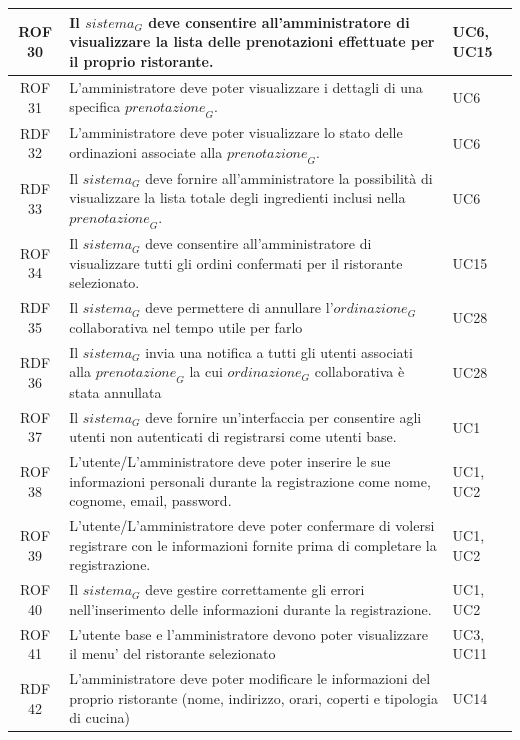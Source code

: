 \documentclass[12pt, oneside]{article}
\begin{document}
\begin{longtable}{|c|p{14cm}|p{2cm}|}
    ROF 30& Il $\textit{sistema}_G$ deve consentire all'amministratore di visualizzare la lista delle prenotazioni effettuate per il proprio ristorante. & UC6, UC15 \\
    \hline
    ROF 31& L'amministratore deve poter visualizzare i dettagli di una specifica $\textit{prenotazione}_G$. & UC6 \\
    \hline
    RDF 32& L'amministratore deve poter visualizzare lo stato delle ordinazioni associate alla $\textit{prenotazione}_G$. & UC6 \\
    \hline
    RDF 33& Il $\textit{sistema}_G$ deve fornire all'amministratore la possibilità di visualizzare la lista totale degli ingredienti inclusi nella $\textit{prenotazione}_G$. & UC6 \\
    \hline
    ROF 34& Il $\textit{sistema}_G$ deve consentire all'amministratore di visualizzare tutti gli ordini confermati per il ristorante selezionato. & UC15 \\
    \hline
    RDF 35& Il $\textit{sistema}_G$ deve permettere di annullare l'$\textit{ordinazione}_G$ collaborativa nel tempo utile per farlo & UC28 \\
    \hline
    RDF 36& Il $\textit{sistema}_G$ invia una notifica a tutti gli utenti associati alla $\textit{prenotazione}_G$ la cui $\textit{ordinazione}_G$ collaborativa è stata annullata & UC28 \\
    \hline
    ROF 37& Il $\textit{sistema}_G$ deve fornire un'interfaccia per consentire agli utenti non autenticati di registrarsi come utenti base. & UC1 \\
    \hline
    ROF 38& L'utente/L'amministratore deve poter inserire le sue informazioni personali durante la registrazione come nome, cognome, email, password. & UC1, UC2 \\
    \hline
    ROF 39& L'utente/L'amministratore deve poter confermare di volersi registrare con le informazioni fornite prima di completare la registrazione. & UC1, UC2 \\
    \hline
    ROF 40& Il $\textit{sistema}_G$ deve gestire correttamente gli errori nell'inserimento delle informazioni durante la registrazione. & UC1, UC2 \\
    \hline 
    ROF 41& L'utente base e l'amministratore devono poter visualizzare il menu' del ristorante selezionato & UC3, UC11\\
    \hline
    RDF 42& L'amministratore deve poter modificare le informazioni del proprio ristorante (nome, indirizzo, orari, coperti e tipologia di cucina) & UC14\\

\end{longtable}
\end{document}
